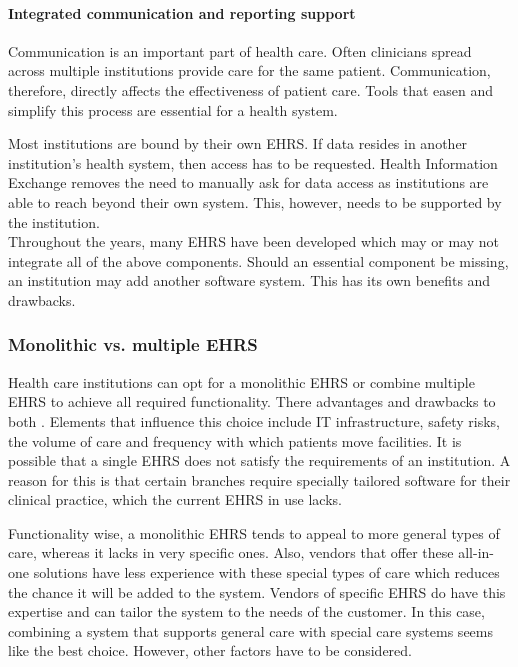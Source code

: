         \paragraph{Integrated communication and reporting support} Communication is an important part of health care. Often clinicians spread across multiple institutions provide care for the same patient. Communication, therefore, directly affects the effectiveness of patient care. Tools that easen and simplify this process are essential for a health system. 

        Most institutions are bound by their own EHRS. If data resides in another institution's health system, then access has to be requested. Health Information Exchange removes the need to manually ask for data access as institutions are able to reach beyond their own system. This, however, needs to be supported by the institution.\\
        
        \noindent Throughout the years, many EHRS have been developed which may or may not integrate all of the above components. Should an essential component be missing, an institution may add another software system. This has its own benefits and drawbacks.

        \subsubsection{Monolithic vs. multiple EHRS} \label{ehrs_comparison}

        Health care institutions can opt for a monolithic EHRS or combine multiple EHRS to achieve all required functionality. There advantages and drawbacks to both \cite{multiple_ehrs}. Elements that influence this choice include IT infrastructure, safety risks, the volume of care and frequency with which patients move facilities. It is possible that a single EHRS does not satisfy the requirements of an institution. A reason for this is that certain branches require specially tailored software for their clinical practice, which the current EHRS in use lacks.

        Functionality wise, a monolithic EHRS tends to appeal to more general types of care, whereas it lacks in very specific ones. Also, vendors that offer these all-in-one solutions have less experience with these special types of care which reduces the chance it will be added to the system. Vendors of specific EHRS do have this expertise and can tailor the system to the needs of the customer. In this case, combining a system that supports general care with special care systems seems like the best choice. However, other factors have to be considered.

